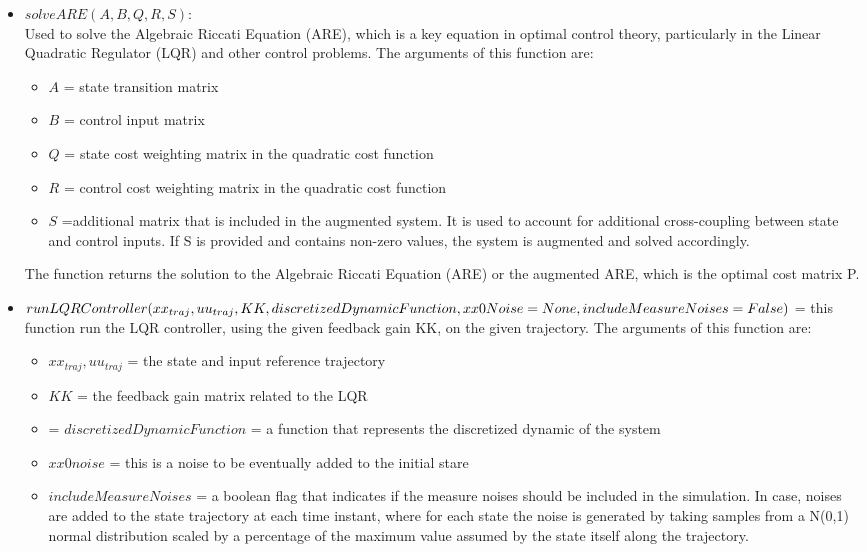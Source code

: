 \documentclass[a4paper,11pt,oneside]{book}
\begin{document}
\begin{itemize}
\begin{itemize}
    \end{itemize}
    \item $solveARE(A, B, Q, R, S):$\\ Used to solve the Algebraic Riccati Equation (ARE), which is a key equation in optimal control theory, particularly in the Linear Quadratic Regulator (LQR) and other control problems. The arguments of this function are:
    \begin{itemize}
        \item $A$ = state transition matrix 
        \item $B$ = control input matrix
        \item $Q$ = state cost weighting matrix in the quadratic cost function
        \item $R$ = control cost weighting matrix in the quadratic cost function
        \item $S$ =additional matrix that is included in the augmented system. It is used to account for additional cross-coupling between state and control inputs. If S is provided and contains non-zero values, the system is augmented and solved accordingly.
    \end{itemize}
    The function returns the solution to the Algebraic Riccati Equation (ARE) or the augmented ARE, which is the optimal cost matrix P.
    \item $runLQRController(xx_{traj}, uu_{traj}, KK, discretizedDynamicFunction,\\ xx0Noise = None, includeMeasureNoises = False)$ = this function run the LQR controller, using the given feedback gain KK, on the given trajectory. The arguments of this function are: 
    \begin{itemize}
        \item $xx_{traj}, uu_{traj}$ = the state and input reference trajectory
        \item $KK$ = the feedback gain matrix related to the LQR 
        \item = $discretizedDynamicFunction$ = a function that represents the discretized dynamic of the system
        \item $xx0noise$ = this is a noise to be eventually added to the initial stare
        \item $includeMeasureNoises$ = a boolean flag that indicates if the measure noises should be included in the simulation. In case, noises are added to the state trajectory at each time instant, where for each state the noise is generated by taking samples from a N(0,1) normal distribution scaled by a percentage of the maximum value assumed by the state itself along the trajectory.

\end{itemize}
\end{itemize}
\end{document}
